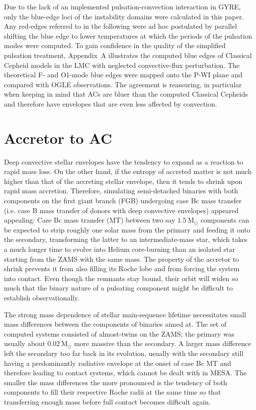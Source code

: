 \documentclass[a4paper,fleqn,usenatbib]{mnras}
\newcommand{\msol}{~\mathrm{M}_\odot}
\begin{document}
Due to the lack of an implemented pulsation-convection interaction  
in GYRE, only the blue-edge loci of the instability domains were calculated in this paper. 
Any red-edges referred to in the following were ad hoc postulated by parallel shifting 
the blue edge to lower temperatures at which the periods of the pulsation 
modes were computed.
To gain confidence in the quality of the simplified pulsation
treatment, Appendix~A illustrates the computed blue edges 
of Classical Cepheid models in the LMC with neglected convective-flux perturbation. 
The theoretical F- and O1-mode 
blue edges were mapped onto the P-WI plane and compared with OGLE observations. 
The agreement is reassuring, in particular when keeping in mind that ACs are bluer
than the computed Classical Cepheids and therefore have envelopes
that are even less affected by convection.



\section{Accretor to AC}
\label{Sect:Accretors}

Deep convective stellar envelopes have the tendency to expand as a reaction to
rapid mass loss. On the other hand, if the entropy of accreted matter is not much
higher than that of the accreting stellar envelope, then it tends to
shrink upon rapid mass accretion. Therefore, simulating semi-detached binaries 
with both components on the first giant branch (FGB) undergoing case Bc mass transfer  
(i.e. case B mass transfer of donors with deep convective envelopes) 
appeared appealing: Case Bc mass transfer (MT) between two 
say $1.5 \msol$  components can be expected to strip
roughly one solar mass from the primary and feeding it onto the secondary, transforming 
the latter to an intermediate-mass star, which takes a much longer time to evolve into Helium 
core-burning than an isolated star starting from the ZAMS with the same mass. 
The property of the accretor to shrink prevents it from also filling its Roche lobe 
and from forcing the system into contact.
Even though the remnants stay bound, their orbit will widen so much that the binary 
nature of a pulsating component might be difficult to establish observationally.

The strong mass dependence of stellar main-sequence lifetime necessitates small
mass differences between the components of binaries aimed at. The set of computed systems 
consisted of almost-twins on the ZAMS; the primary was usually about $0.02 \msol$  
more massive than the secondary. A larger mass difference left the secondary
too far back in its evolution, usually with the secondary still having a predominantly 
radiative envelope at the onset of case Bc MT and therefore leading to contact systems, 
which cannot be dealt with in MESA.
The smaller the mass differences the more pronounced is the tendency of both components
to fill their respective Roche radii at the same time  so that transferring enough mass 
before full contact becomes difficult again. 
\end{document}
